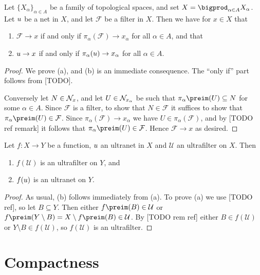\documentclass[article, a4paper, 11pt, oneside]{memoir}
\numberwithin{equation}{chapter}
\newcommand{\calU}{\mathcal{U}}
\newcommand{\calF}{\mathcal{F}}
\theoremstyle{nonumberplain}
\begin{document}
\begin{proposition}
    Let $\{X_\alpha\}_{\alpha \in A}$ be a family of topological spaces, and set $X = \bigprod_{\alpha \in A} X_\alpha$. Let $u$ be a net in $X$, and let $\calF$ be a filter in $X$. Then we have for $x \in X$ that
    \begin{enumerate}
        \item $\calF \to x$ if and only if $\pi_\alpha(\calF) \to x_\alpha$ for all $\alpha \in A$, and that
        \item $u \to x$ if and only if $\pi_\alpha(u) \to x_\alpha$ for all $\alpha \in A$.
    \end{enumerate}
\end{proposition}

\begin{proof}
    We prove (a), and (b) is an immediate consequence. The \enquote{only if} part follows from [TODO].
    
    Conversely let $N \in \mathcal{N}_{x}$, and let $U \in \mathcal{N}_{x_\alpha}$ be such that $\pi_\alpha\preim(U) \subseteq N$ for some $\alpha \in A$. Since $\calF$ is a filter, to show that $N \in \calF$ it suffices to show that $\pi_\alpha\preim(U) \in \calF$. Since $\pi_\alpha(\calF) \to x_\alpha$ we have $U \in \pi_\alpha(\calF)$, and by [TODO ref remark] it follows that $\pi_\alpha\preim(U) \in \calF$. Hence $\calF \to x$ as desired.
\end{proof}


\begin{proposition}
    Let $f \colon X \to Y$ be a function, $u$ an ultranet in $X$ and $\calU$ an ultrafilter on $X$. Then
    \begin{enumerate}
        \item $f(\calU)$ is an ultrafilter on $Y$, and
        \item $f(u)$ is an ultranet on $Y$.
    \end{enumerate}
\end{proposition}

\begin{proof}
    As usual, (b) follows immediately from (a). To prove (a) we use [TODO ref], so let $B \subseteq Y$. Then either $f\preim(B) \in \calU$ or $f\preim(Y \setminus B) = X \setminus f\preim(B) \in \calU$. By [TODO rem ref] either $B \in f(\calU)$ or $Y \setminus B \in f(\calU)$, so $f(\calU)$ is an ultrafilter.
\end{proof}


\chapter{Compactness}
\end{document}
